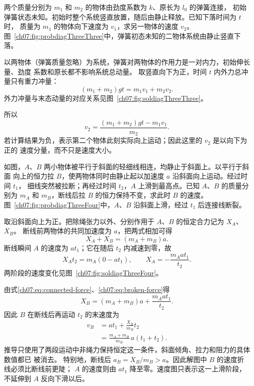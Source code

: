 {
\begin{origexamplebox}{}\label{ch07:ex:s07-3-3}
两个质量分别为 $m_1$ 和 $m_2$ 的物体由劲度系数为 $k$、原长为 $l_0$ 的弹簧连接，
初始弹簧状态未知。初始时整个系统竖直放置，随后由静止释放。已知下落时间为 $t$ 时，
质量为 $m_1$ 的物体向下速度为 $v_1$，求另一物体的速度 $v_2$。
图~\ref{ch07:fig:probdiagThreeThree}中，弹簧初态未知的二物体系统由静止竖直下落。
\probdiagThreeThree
\end{origexamplebox}

\begin{xesolution}
以两物体（弹簧质量忽略）为系统，弹簧对两物体的作用力是一对内力，初始伸长量、劲度
系数和原长都不影响系统总动量。
取竖直向下为正，时间 $t$ 内外力总冲量只有重力冲量：
\[
 (m_1+m_2)gt=m_1v_1+m_2v_2.
\]
外力冲量与末态动量的对应关系见图~\ref{ch07:fig:soldiagThreeThree}。

\soldiagThreeThree
所以
\[
 \boxed{v_2=\frac{(m_1+m_2)gt-m_1v_1}{m_2}}.
\]
若计算结果为负，表示第二个物体此刻实际向上运动；因此这里的 $v_2$ 是以向下为正的
速度分量，而不只是速度大小。
\end{xesolution}

\begin{origexamplebox}{}\label{ch07:ex:s07-3-4}
如图，$A$、$B$ 两小物体被平行于斜面的轻细线相连，均静止于斜面上。以平行于斜面
向上的恒力拉 $B$，使两物体同时由静止起以加速度 $a$ 沿斜面向上运动。经过时间 $t_1$，
细线突然被拉断；再经过时间 $t_2$，$A$ 上滑到最高点。已知 $A$、$B$ 的质量分别为
$m_A$ 和 $m_B$，断线后拉 $B$ 的恒力保持不变，求此时 $B$ 的速度。
图~\ref{ch07:fig:probdiagThreeFour}中，$A$、$B$ 沿斜面上滑，经过 $t_1$ 后连接线断裂。
\probdiagThreeFour
\end{origexamplebox}

\begin{xesolution}
取沿斜面向上为正。把除绳张力以外、分别作用于 $A$、$B$ 的恒定合力记为 $X_A$、$X_B$。
断线前两物体的共同加速度为 $a$，把两式相加可得
\begin{equation}\label{ch07:eq:connected-force}
 X_A+X_B=(m_A+m_B)a.
\end{equation}
断线瞬间 $A$ 的速度为 $at_1$；它在随后 $t_2$ 内减速到零，故
\begin{equation}\label{ch07:eq:broken-force}
 X_A t_2=m_A(0-at_1),
 \qquad
 X_A=-\frac{m_Aat_1}{t_2}.
\end{equation}
两阶段的速度变化见图~\ref{ch07:fig:soldiagThreeFour}。

\soldiagThreeFour
由式\eqref{ch07:eq:connected-force}、\eqref{ch07:eq:broken-force}得
\[
 X_B=(m_A+m_B)a+\frac{m_Aat_1}{t_2}.
\]
因此 $B$ 在断线后再运动 $t_2$ 的末速度为
\begin{align*}
 v_B&=at_1+\frac{X_B}{m_B}t_2\\
 &=\boxed{\frac{m_A+m_B}{m_B}\,a(t_1+t_2)}.
\end{align*}
推导只使用了两段运动中非绳力保持恒定这一条件，斜面倾角、拉力和阻力的具体数值都已
被消去。
特别地，断线后 $a_B=X_B/m_B>a$。因此解图中 $B$ 的速度折线必须比断线前更陡；
$A$ 的速度则由 $at_1$ 降至零。速度图只表示这一上滑阶段，不延伸到 $A$ 反向下滑以后。
\end{xesolution}

}
